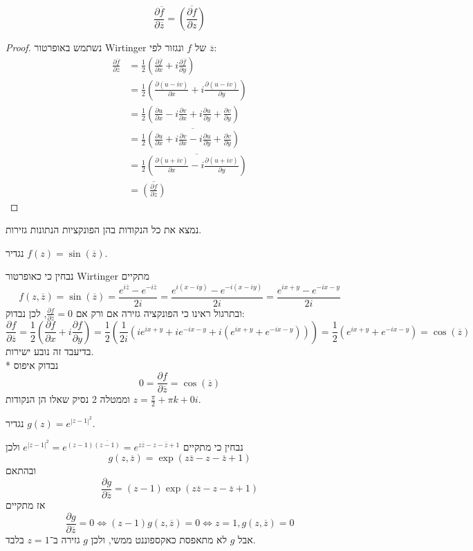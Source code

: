 \Subquestion{}
\[
	\frac{\partial \overline{f}}{\partial \overline{z}}
	= \overline{\left( \frac{\partial f}{\partial z} \right)}
\]
\begin{proof}
	נשתמש באופרטור Wirtinger של $f$ ונגזור לפי $\overline{z}$:
	\begin{align*}
		\frac{\partial \overline{f}}{\partial \overline{z}}
		& = \frac{1}{2} (\frac{\partial \overline{f}}{\partial x} + i\frac{\partial \overline{f}}{\partial y}) \\
		& = \frac{1}{2} (\frac{\partial (u - i v)}{\partial x} + i\frac{\partial (u - i v)}{\partial y}) \\
		& = \frac{1}{2} (\frac{\partial u}{\partial x} - i \frac{\partial v}{\partial x} + i \frac{\partial u}{\partial y} + \frac{\partial v}{\partial y}) \\
		& = \frac{1}{2} \overline{(\frac{\partial u}{\partial x} + i \frac{\partial v}{\partial x} - i \frac{\partial u}{\partial y} + \frac{\partial v}{\partial y})} \\
		& = \frac{1}{2} \overline{(\frac{\partial (u + iv)}{\partial x} - i \frac{\partial (u + iv)}{\partial y})} \\
		& = \overline{\left(\frac{\partial f}{\partial z}\right)}
	\end{align*}
\end{proof}

\Question{}
נמצא את כל הנקודות בהן הפונקציות הנתונות גזירות.

\Subquestion{}
נגדיר $f(z) = \sin(\overline{z})$.
\begin{solution}
	נבחין כי כאופרטור Wirtinger מתקיים
	\[
		f(z, \overline{z})
		= \sin(\overline{z})
		= \frac{e^{i \overline{z}} - e^{-i \overline{z}}}{2i}
		= \frac{e^{i (x - iy)} - e^{-i (x - iy)}}{2i}
		= \frac{e^{ix + y} - e^{-ix - y}}{2i}
	\]
	ובתרגול ראינו כי הפונקציה גזירה אם ורק אם $\frac{\partial f}{\partial \overline{z}} = 0$, לכן נבדוק:
	\[
		\frac{\partial f}{\partial \overline{z}}
		= \frac{1}{2} (\frac{\partial f}{\partial x} + i \frac{\partial f}{\partial y})
		= \frac{1}{2} (\frac{1}{2i}(i e^{ix + y} + i e^{-ix - y} + i(e^{ix + y} + e^{-ix - y})))
		= \frac{1}{2}(e^{ix + y} + e^{-ix - y})
		= \cos(\overline{z})
	\]
	בדיעבד זה נובע ישירות. \\*
	נבדוק איפוס
	\[
		0 = \frac{\partial f}{\partial \overline{z}} = \cos(\overline{z})
	\]
	וממטלה 2 נסיק שאלו הן הנקודות $z = \frac{\pi}{2} + \pi k + 0 i$.
\end{solution}

\Subquestion{}
נגדיר $g(z) = e^{{|z - 1|}^2}$.
\begin{solution}
	נבחין כי מתקיים $e^{{|z - 1|}^2} = e^{(z - 1) \overline{(z - 1)}} = e^{z \overline{z} - z - \overline{z} + 1}$ ולכן
	\[
		g(z, \overline{z}) = \exp(z \overline{z} - z - \overline{z} + 1)
	\]
	ובהתאם
	\[
		\frac{\partial g}{\partial \overline{z}} = (z - 1) \exp(z \overline{z} - z - \overline{z} + 1)
	\]
	אז מתקיים
	\[
		\frac{\partial g}{\partial \overline{z}} = 0
		\iff (z - 1) g(z, \overline{z}) = 0
		\iff z = 1, g(z, \overline{z}) = 0
	\]
	אבל $g$ לא מתאפסת כאקספוננט ממשי, ולכן $g$ גזירה ב־$z = 1$ בלבד.
\end{solution}

